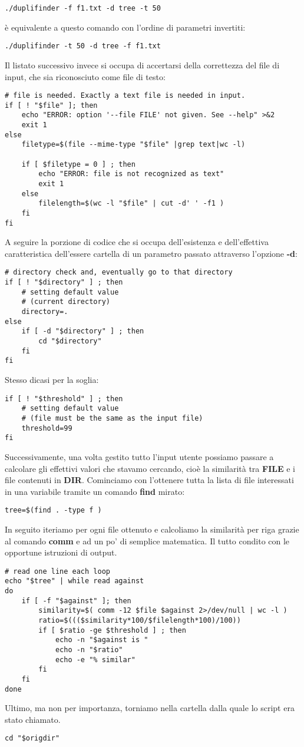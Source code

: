 \documentclass[a4paper,10pt]{article}
\begin{document}
\begin{lstlisting}
./duplifinder -f f1.txt -d tree -t 50
\end{lstlisting}
è equivalente a questo comando con l'ordine di parametri invertiti:
\begin{lstlisting}
./duplifinder -t 50 -d tree -f f1.txt
\end{lstlisting}
Il listato successivo invece si occupa di accertarsi della correttezza del file di input,
che sia riconosciuto come file di testo:
\begin{lstlisting}
# file is needed. Exactly a text file is needed in input.
if [ ! "$file" ]; then
	echo "ERROR: option '--file FILE' not given. See --help" >&2
	exit 1
else
	filetype=$(file --mime-type "$file" |grep text|wc -l)

	if [ $filetype = 0 ] ; then
		echo "ERROR: file is not recognized as text"
		exit 1
	else
		filelength=$(wc -l "$file" | cut -d' ' -f1 )
	fi
fi
\end{lstlisting}
A seguire la porzione di codice che si occupa dell'esistenza e dell'effettiva caratteristica dell'essere cartella di un parametro
 passato attraverso l'opzione \textbf{-d}:
\begin{lstlisting}
# directory check and, eventually go to that directory
if [ ! "$directory" ] ; then
	# setting default value 
	# (current directory)
	directory=.
else
	if [ -d "$directory" ] ; then
		cd "$directory"
	fi
fi
\end{lstlisting}
Stesso dicasi per la soglia:
\begin{lstlisting}
if [ ! "$threshold" ] ; then
	# setting default value 
	# (file must be the same as the input file)
	threshold=99
fi
\end{lstlisting}
Successivamente, una volta gestito tutto l'input utente possiamo passare a calcolare gli effettivi valori che stavamo cercando, cioè la
similarità tra \textbf{FILE} e i file contenuti in \textbf{DIR}. Cominciamo con l'ottenere tutta la lista di file interessati in una variabile
tramite un comando \textbf{find} mirato:
\begin{lstlisting}
tree=$(find . -type f )
\end{lstlisting}
In seguito iteriamo per ogni file ottenuto e calcoliamo la similarità per riga grazie al comando \textbf{comm} e ad un po' di semplice matematica.
Il tutto condito con le opportune istruzioni di output.
\begin{lstlisting}
# read one line each loop
echo "$tree" | while read against
do
	if [ -f "$against" ]; then
		similarity=$( comm -12 $file $against 2>/dev/null | wc -l )
		ratio=$((($similarity*100/$filelength*100)/100))
		if [ $ratio -ge $threshold ] ; then
			echo -n "$against is "
			echo -n "$ratio"
			echo -e "% similar"
		fi
	fi
done
\end{lstlisting}
Ultimo, ma non per importanza, torniamo nella cartella dalla quale lo script era stato chiamato.
\begin{lstlisting}
cd "$origdir" 
\end{lstlisting}
\end{document}
